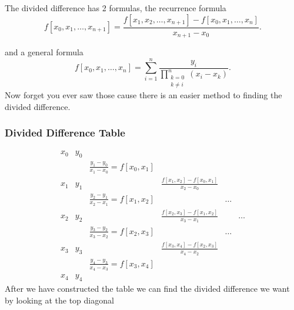 \documentclass{report}
\begin{document}
The divided difference has 2 formulas, the recurrence formula
\[
	f[x_0,x_1,\dots,x_{n+1}] = \frac{f[x_1,x_2,\dots,x_{n+1}]-f[x_0,x_1,\dots,x_{n}]}{x_{n+1}-x_0}
	.\]

and a general formula
\[
	f[x_0,x_1,\dots,x_n] = \sum_{i=1}^{n}\frac{y_i }{\prod_{\substack{k=0\\k\neq i}}^{n} (x_i - x_k)}
	.\]
Now forget you ever saw those cause there is an easier method to finding the divided difference.

\subsubsection{Divided Difference Table}
\[
	\begin{array}{cccccc}
		x_0 & y_0                                                                                              \\
		    &     & \frac{y_1-y_0}{x_1-x_0}=f[x_0,x_1]                                                         \\
		x_1 & y_1 &                                    & \frac{f[x_1,x_2]-f[x_0,x_1]}{x_2-x_0}                 \\
		    &     & \frac{y_2-y_1}{x_2-x_1}=f[x_1,x_2] &                                       & \dots         \\
		x_2 & y_2 &                                    & \frac{f[x_2,x_3]-f[x_1,x_2]}{x_3-x_1} &       & \dots \\
		    &     & \frac{y_3-y_2}{x_3-x_2}=f[x_2,x_3] &                                       & \dots         \\
		x_3 & y_3 &                                    & \frac{f[x_3,x_4]-f[x_2,x_3]}{x_4-x_2}                 \\
		    &     & \frac{y_4-y_3}{x_4-x_3}=f[x_3,x_4]                                                         \\
		x_4 & y_4
	\end{array}
\]
After we have constructed the table we can find the divided difference we want by looking at the top diagonal
\end{document}
